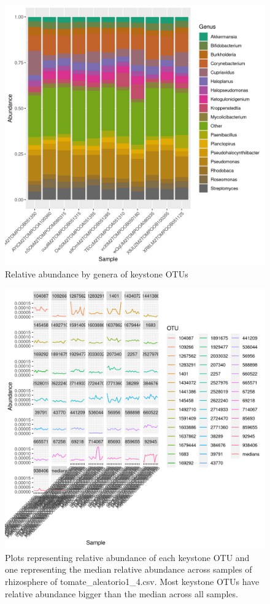 \begin{figure}
\centering
\includegraphics[scale = 0.8]{tomate_aleatorio1_4.csv_relative_abundance_Genus.png}
\caption{Relative abundance by genera of keystone OTUs }
\label{fig:tomate_aleatorio1_4.csv_genus}
\end{figure}
\begin{figure}
   \centering
   \includegraphics[scale = 0.8]{abundance_tomate_aleatorio1_4.csv_key_otus_medians.png}
   \caption{Plots representing relative abundance of each keystone OTU and one representing the median relative abundance  across samples of rhizosphere of tomate_aleatorio1_4.csv. Most keystone OTUs have relative abundance bigger than the median across all samples.  }
   \label{key_otus_vs_medians_tomate_aleatorio1_4.csv}
\end{figure}
